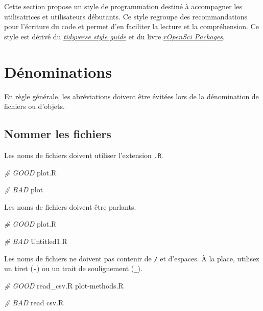 \documentclass[
  french,
]{scrbook}
\newenvironment{Shaded}{\begin{snugshade}}{\end{snugshade}}
\newcommand{\CommentTok}[1]{\textcolor[rgb]{0.56,0.35,0.01}{\textit{#1}}}
\newcommand{\NormalTok}[1]{#1}
\newcommand{\SpecialCharTok}[1]{\textcolor[rgb]{0.00,0.00,0.00}{#1}}
\begin{document}
Cette section propose un style de programmation destiné à accompagner les utilisatrices et utilisateurs débutants. Ce style regroupe des recommandations pour l'écriture du code et permet d'en faciliter la lecture et la compréhension. Ce style est dérivé du \href{https://style.tidyverse.org}{\emph{tidyverse style guide}} et du livre \href{https://devguide.ropensci.org}{\emph{rOpenSci Packages}}.

\hypertarget{style-naming}{%
\section{Dénominations}\label{style-naming}}

En règle générale, les abréviations doivent être évitées lors de la dénomination de fichiers ou d'objets.

\hypertarget{nommer-les-fichiers}{%
\subsection{Nommer les fichiers}\label{nommer-les-fichiers}}

Les noms de fichiers doivent utiliser l'extension \texttt{.R}.

\begin{Shaded}
\begin{Highlighting}[]
\CommentTok{\# GOOD}
\NormalTok{plot.R}

\CommentTok{\# BAD}
\NormalTok{plot}
\end{Highlighting}
\end{Shaded}

Les noms de fichiers doivent être parlants.

\begin{Shaded}
\begin{Highlighting}[]
\CommentTok{\# GOOD}
\NormalTok{plot.R}

\CommentTok{\# BAD}
\NormalTok{Untitled1.R}
\end{Highlighting}
\end{Shaded}

Les noms de fichiers ne doivent pas contenir de \texttt{/} et d'espaces. À la place, utilisez un tiret (\texttt{-}) ou un trait de soulignement (\texttt{\_}).

\begin{Shaded}
\begin{Highlighting}[]
\CommentTok{\# GOOD}
\NormalTok{read\_csv.R}
\NormalTok{plot}\SpecialCharTok{{-}}\NormalTok{methods.R}

\CommentTok{\# BAD}
\NormalTok{read csv.R}
\end{Highlighting}
\end{Shaded}
\end{document}

